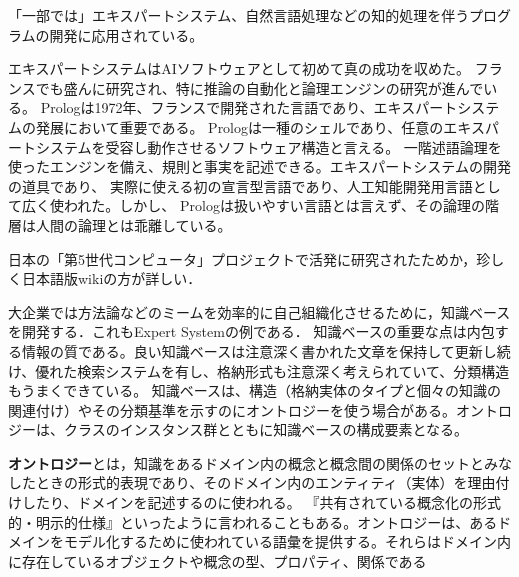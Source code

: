 \documentclass[uplatex, 12pt, dvipdfmx]{jsreport}
\begin{document}
\begin{application}
    「一部では」エキスパートシステム、自然言語処理などの知的処理を伴うプログラムの開発に応用されている。

    エキスパートシステムはAIソフトウェアとして初めて真の成功を収めた。
    フランスでも盛んに研究され、特に推論の自動化と論理エンジンの研究が進んでいる。
    Prologは1972年、フランスで開発された言語であり、エキスパートシステムの発展において重要である。
    Prologは一種のシェルであり、任意のエキスパートシステムを受容し動作させるソフトウェア構造と言える。
    一階述語論理を使ったエンジンを備え、規則と事実を記述できる。エキスパートシステムの開発の道具であり、
    実際に使える初の宣言型言語であり、人工知能開発用言語として広く使われた。しかし、
    Prologは扱いやすい言語とは言えず、その論理の階層は人間の論理とは乖離している。
\end{application}
\begin{remark}
    日本の「第5世代コンピュータ」プロジェクトで活発に研究されたためか，珍しく日本語版wikiの方が詳しい．
\end{remark}

\begin{definition}
    大企業では方法論などのミームを効率的に自己組織化させるために，知識ベースを開発する．これもExpert Systemの例である．
    知識ベースの重要な点は内包する情報の質である。良い知識ベースは注意深く書かれた文章を保持して更新し続け、優れた検索システムを有し、格納形式も注意深く考えられていて、分類構造もうまくできている。
    知識ベースは、構造（格納実体のタイプと個々の知識の関連付け）やその分類基準を示すのにオントロジーを使う場合がある。オントロジーは、クラスのインスタンス群とともに知識ベースの構成要素となる。

    \textbf{オントロジー}とは，知識をあるドメイン内の概念と概念間の関係のセットとみなしたときの形式的表現であり、そのドメイン内のエンティティ（実体）を理由付けしたり、ドメインを記述するのに使われる。
    『共有されている概念化の形式的・明示的仕様』といったように言われることもある。オントロジーは、あるドメインをモデル化するために使われている語彙を提供する。それらはドメイン内に存在しているオブジェクトや概念の型、プロパティ、関係である
\end{definition}
\end{document}
